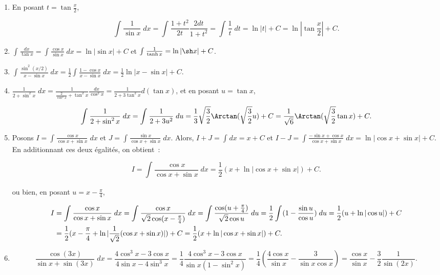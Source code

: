 {{\begin{enumerate}
ou bien

$$\int_{}^{}\frac{1}{\ch x}\;dx
=\int_{}^{}\frac{\ch x}{\sh^2x+1}\;dx=\Arctan(\sh x)+C.$$
\item  En posant $t=\tan\frac{x}{2}$,

$$\int_{}^{}\frac{1}{\sin x}\;dx=\int_{}^{}\frac{1+t^2}{2t}\frac{2dt}{1+t^2}=\int_{}^{}\frac{1}{t}\;dt=\ln|t|+C=\ln|\tan\frac{x}{2}|+C.$$

\item  $\int_{}^{}\frac{dx}{\tan x}=\int_{}^{}\frac{\cos x}{\sin x}\;dx=\ln|\sin x|+C$ et $\int_{}^{}\frac{1}{\tanh x}=\ln|\sh x|+C$.

\item  $\int_{}^{}\frac{\sin^2(x/2)}{x-\sin x}\;dx=\frac{1}{2}\int_{}^{}\frac{1-\cos x}{x-\sin x}\;dx=\frac{1}{2}\ln|x-\sin x|+C$.

\item  $\frac{1}{2+\sin^2x}\;dx=\frac{1}{\frac{2}{\cos^2x}+\tan^2x}\frac{dx}{\cos^2x}=\frac{1}{2+3\tan^2x}d(\tan x)$, et en posant $u=\tan x$,

$$\int_{}^{}\frac{1}{2+\sin^2x}\;dx=\int_{}^{}\frac{1}{2+3u^2}\;du=\frac{1}{3}\sqrt{\frac{3}{2}}\Arctan(\sqrt{\frac{3}{2}}u)+C=\frac{1}{\sqrt{6}}\Arctan(\sqrt{\frac{3}{2}}\tan x)+C.$$

\item  Posons $I=\int_{}^{}\frac{\cos x}{\cos x+\sin x}\;dx$ et $J=\int_{}^{}\frac{\sin x}{\cos x+\sin x}\;dx$. Alors, $I+J=\int_{}^{}dx=x+C$ et $I-J=\int_{}^{}\frac{-\sin x+\cos x}{\cos x+\sin x}\;dx=\ln|\cos x+\sin x|+C$. En additionnant ces deux égalités, on obtient~:

$$I=\int_{}^{}\frac{\cos x}{\cos x+\sin x}\;dx=\frac{1}{2}(x+\ln|\cos x+\sin x|)+C.$$

ou bien, en posant $u=x-\frac{\pi}{4}$,

\begin{align*}\ensuremath
I&=\int_{}^{}\frac{\cos x}{\cos x+\sin x}\;dx=\int_{}^{}\frac{\cos x}{\sqrt{2}\cos(x-\frac{\pi}{4})}\;dx
=\int_{}^{}\frac{\cos(u+\frac{\pi}{4})}{\sqrt{2}\cos u}\;du=\frac{1}{2}\int_{}^{}(1-\frac{\sin u}{\cos u})\;du
=\frac{1}{2}(u+\ln|\cos u|)+C\\
 &=\frac{1}{2}(x-\frac{\pi}{4}+\ln|\frac{1}{\sqrt{2}}(\cos x+\sin x)|)+C=\frac{1}{2}(x+\ln|\cos x+\sin x|)+C.
\end{align*}

\item  

$$\frac{\cos(3x)}{\sin x+\sin(3x)}\;dx=\frac{4\cos^3x-3\cos x}{4\sin x-4\sin^3x}=\frac{1}{4}\frac{4\cos^3x-3\cos x}{\sin x(1-\sin^2x)}=\frac{1}{4}(\frac{4\cos x}{\sin x}-\frac{3}{\sin x\cos x})=\frac{\cos x}{\sin x}-\frac{3}{2}\frac{1}{\sin(2x)}.
$$


\end{enumerate}}}
